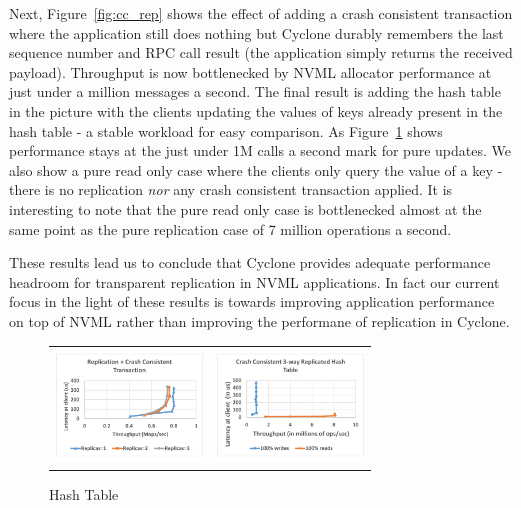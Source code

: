 \documentclass[letterpaper,twocolumn,10pt]{article}
\begin{document}
Next, Figure~\ref{fig:cc_rep} shows the effect of adding a crash
consistent transaction where the application still does nothing but Cyclone
durably remembers the last sequence number and RPC call result (the application
simply returns the received payload). Throughput is now bottlenecked by NVML
allocator performance at just under a million messages a second. The final
result is adding the hash table in the picture with the clients updating the
values of keys already present in the hash table - a stable workload for easy
comparison. As Figure~\ref{fig:app_rep} shows performance stays at the just
under 1M calls a second mark for pure updates. We also show a
pure read only case where the clients only query the value of a key - there is
no replication \emph{nor} any crash consistent transaction applied. It is
interesting to note that the pure read only case is bottlenecked almost at the same
point as the pure replication case of 7 million operations a second.

These results lead us to conclude that Cyclone provides adequate performance
headroom for transparent replication in NVML applications. In fact our current
focus in the light of these results is towards improving application performance
on top of NVML rather than improving the performane of replication in Cyclone.

\begin{figure}
\begin{tabular}{cc}
\begin{minipage}{0.25\textwidth}
  \hspace{-0.17in}
  \includegraphics[width=\textwidth,height=3cm]{results/cc_mops.pdf}
  \caption{Crash Consistency}
  \label{fig:cc_rep}
\end{minipage} &
  \hspace{-0.37in}
\begin{minipage}{0.25\textwidth}
  \includegraphics[width=\textwidth,height=3cm]{results/app_mops.pdf}
  \caption{Hash Table}
  \label{fig:app_rep}
\end{minipage}
\end{tabular}
\end{figure}
\end{document}
